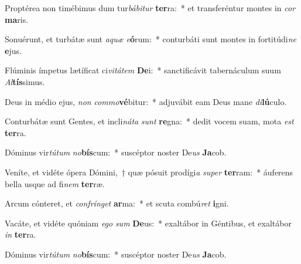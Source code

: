 \item Proptérea non timébimus dum tur\textit{bá}\textit{bi}\textit{tur} \textbf{ter}ra:~* et transferéntur montes in \textit{cor} \textbf{ma}ris.
\item Sonuérunt, et turbátæ sunt \textit{a}\textit{quæ} \textit{e}\textbf{ó}rum:~* conturbáti sunt montes in fortitúdi\textit{ne} \textbf{e}jus.
\item Flúminis ímpetus lætíficat ci\textit{vi}\textit{tá}\textit{tem} \textbf{De}i:~* sanctificávit tabernáculum suum \textit{Al}\textbf{tís}simus.
\item Deus in médio ejus, \textit{non} \textit{com}\textit{mo}\textbf{vé}bitur:~* adjuvábit eam Deus mane \textit{di}\textbf{lú}culo.
\item Conturbátæ sunt Gentes, et incli\textit{ná}\textit{ta} \textit{sunt} \textbf{re}gna:~* dedit vocem suam, mota \textit{est} \textbf{ter}ra.
\item Dóminus vir\textit{tú}\textit{tum} \textit{no}\textbf{bís}cum:~* suscéptor noster De\textit{us} \textbf{Ja}cob.
\item Veníte, et vidéte ópera Dómini,~† quæ pósuit prodígi\textit{a} \textit{su}\textit{per} \textbf{ter}ram:~* áuferens bella usque ad fi\textit{nem} \textbf{ter}ræ.
\item Arcum cónteret, et \textit{con}\textit{frín}\textit{get} \textbf{ar}ma:~* et scuta combú\textit{ret} \textbf{i}gni.
\item Vacáte, et vidéte quóniam \textit{e}\textit{go} \textit{sum} \textbf{De}us:~* exaltábor in Géntibus, et exaltábor \textit{in} \textbf{ter}ra.
\item Dóminus vir\textit{tú}\textit{tum} \textit{no}\textbf{bís}cum:~* suscéptor noster De\textit{us} \textbf{Ja}cob.
